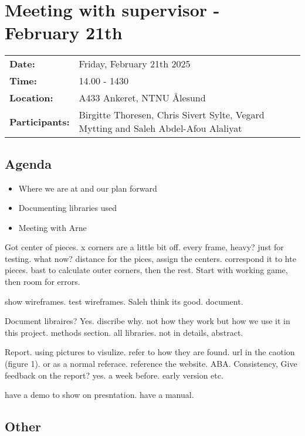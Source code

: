 \section{Meeting with supervisor - February 21th}
\begin{tabular}{ll}
    \textbf{Date:} & Friday, February 21th 2025 \\
    \textbf{Time:} & 14.00 - 1430\\
    \textbf{Location:} & A433 Ankeret, NTNU Ålesund \\
    \textbf{Participants:} & Birgitte Thoresen, Chris Sivert Sylte, Vegard Mytting and Saleh Abdel-Afou Alaliyat\\
\end{tabular}

\vspace{0.5cm}

\subsection{Agenda}

\begin{itemize}
    \item Where we are at and our plan forward 
    \item Documenting libraries used
    \item Meeting with Arne 
\end{itemize}

Got center of pieces. x corners are a little bit off. every frame, heavy? just for testing. what now? distance for the pices, assign the centers. correspond it to hte pieces. bast to calculate outer corners, then the rest. Start with working game, then room for errors. 

show wireframes. test wireframes. Saleh think its good. document. 

Document libraires? Yes. discribe why. not how they work but how we use it in this project. methods section. all libraries. not in details, abstract. 

Report. using pictures to visulize. refer to how they are found. url in the caotion (figure 1). or as a normal referace. reference the website. ABA. Consistency, Give feedback on the report? yes. a week before. early version etc.

have a demo to show on presntation. have a manual. 

\subsection{Other}

